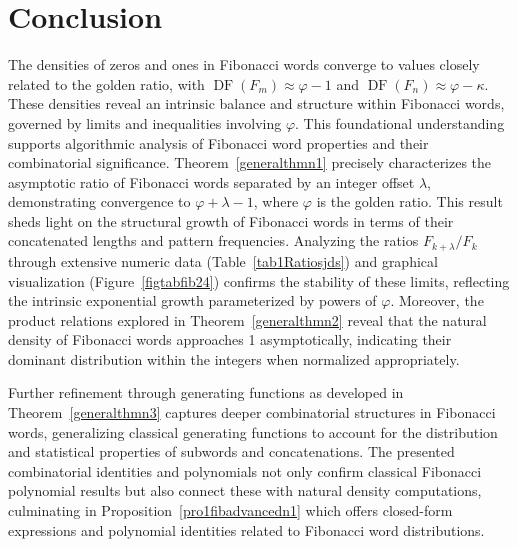 \documentclass[11pt, a4paper]{article}
\newcommand{\DF}{\operatorname{DF}}
\theoremstyle{definition}
\begin{document}
\section{Conclusion}
The densities of zeros and ones in Fibonacci words converge to values closely related to the golden ratio, with $\DF(F_m) \approx \varphi - 1$ and $\DF(F_n) \approx \varphi - \kappa$. These densities reveal an intrinsic balance and structure within Fibonacci words, governed by limits and inequalities involving $\varphi$. This foundational understanding supports algorithmic analysis of Fibonacci word properties and their combinatorial significance. Theorem~\ref{generalthmn1} precisely characterizes the asymptotic ratio of Fibonacci words separated by an integer offset $\lambda$, demonstrating convergence to $\varphi + \lambda - 1$, where $\varphi$ is the golden ratio. This result sheds light on the structural growth of Fibonacci words in terms of their concatenated lengths and pattern frequencies. Analyzing the ratios $F_{k+\lambda}/F_k$ through extensive numeric data (Table~\ref{tab1Ratiosjds}) and graphical visualization (Figure~\ref{figtabfib24}) confirms the stability of these limits, reflecting the intrinsic exponential growth parameterized by powers of $\varphi$. Moreover, the product relations explored in Theorem~\ref{generalthmn2} reveal that the natural density of Fibonacci words approaches 1 asymptotically, indicating their dominant distribution within the integers when normalized appropriately.

Further refinement through generating functions as developed in Theorem~\ref{generalthmn3} captures deeper combinatorial structures in Fibonacci words, generalizing classical generating functions to account for the distribution and statistical properties of subwords and concatenations. The presented combinatorial identities and polynomials not only confirm classical Fibonacci polynomial results but also connect these with natural density computations, culminating in Proposition~\ref{pro1fibadvancedn1} which offers closed-form expressions and polynomial identities related to Fibonacci word distributions.
\end{document}
